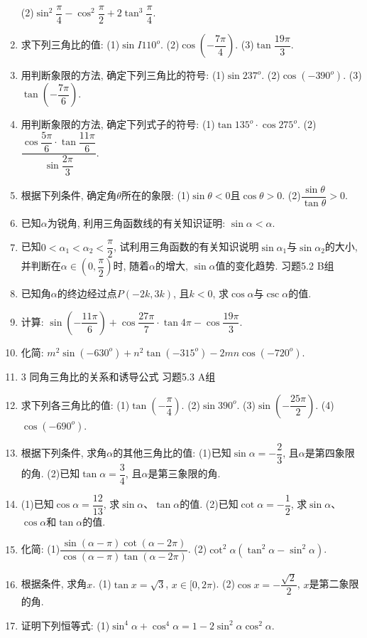 \documentclass[10pt,a4paper]{article}
\begin{document}
\begin{enumerate}[1.]
(2)$\sin ^2\dfrac{\pi }4-\cos ^2\dfrac{\pi }2+2\tan ^3\dfrac{\pi }4$.
\item 求下列三角比的值:
(1)$\sin I110^o$.						(2)$\cos (-\dfrac{7\pi }4)$.
(3)$\tan \dfrac{19\pi }3$.
\item 用判断象限的方法, 确定下列三角比的符号:
(1)$\sin 237^o$.						(2)$\cos (-390^o)$.
(3)$\tan (-\dfrac{7\pi }6)$.
\item 用判断象限的方法, 确定下列式子的符号:
(1)$\tan 135^o\cdot \cos 275^o$.				(2)$\dfrac{\cos \dfrac{5\pi }6\cdot \tan \dfrac{11\pi }6}{\sin \dfrac{2\pi }3}$.
\item 根据下列条件, 确定角$\theta$所在的象限:
(1)$\sin \theta <0$且$\cos \theta >0$.			(2)$\dfrac{\sin \theta }{\tan \theta }>0$.
\item 已知$\alpha$为锐角, 利用三角函数线的有关知识证明: $\sin \alpha <\alpha$.
\item 已知$0<\alpha _1<\alpha _2<\dfrac{\pi }2$, 试利用三角函数的有关知识说明$\sin \alpha _1$与$\sin \alpha _2$的大小, 并判断在$\alpha \in (0,\dfrac{\pi }2)$时, 随着$\alpha$的增大, $\sin \alpha$值的变化趋势.
习题5.2  B组
\item 已知角$\alpha$的终边经过点$P(-2k,3k)$, 且$k<0$, 求$\cos \alpha$与$\csc \alpha$的值.
\item 计算: $\sin (-\dfrac{11\pi }6)+\cos \dfrac{27\pi }7\cdot \tan 4\pi -\cos \dfrac{19\pi }3$.
\item 化简: $m^2\sin (-630^o)+n^2\tan (-315^o)-2mn\cos (-720^o)$.
\item 3  同角三角比的关系和诱导公式
习题5.3  A组
\item 求下列各三角比的值:
(1)$\tan (-\dfrac{\pi }4)$.						(2)$\sin 390^o$.
(3)$\sin (-\dfrac{25\pi }2)$.					(4)$\cos (-690^o)$.
\item 根据下列条件, 求角$\alpha$的其他三角比的值:
(1)已知$\sin \alpha =-\dfrac 23$, 且$\alpha$是第四象限的角.
(2)已知$\tan \alpha =\dfrac 34$, 且$\alpha$是第三象限的角.
\item (1)已知$\cos \alpha =\dfrac{12}{13}$, 求$\sin \alpha$、$\tan \alpha$的值.
(2)已知$\cot \alpha =-\dfrac 12$, 求$\sin \alpha$、$\cos \alpha$和$\tan \alpha$的值.
\item 化简:
(1)$\dfrac{\sin (\alpha -\pi)\cot (\alpha -2\pi)}{\cos (\alpha -\pi)\tan (\alpha -2\pi)}$.
(2)$\cot ^2\alpha (\tan ^2\alpha -\sin ^2\alpha)$.
\item 根据条件, 求角$x$.
(1)$\tan x=\sqrt 3$, $x\in [0,2\pi)$.
(2)$\cos x=-\dfrac{\sqrt 2}2$, $x$是第二象限的角.
\item 证明下列恒等式:
(1)$\sin ^4\alpha +\cos ^4\alpha =1-2\sin ^2\alpha \cos ^2\alpha$.

\end{enumerate}
\end{document}
